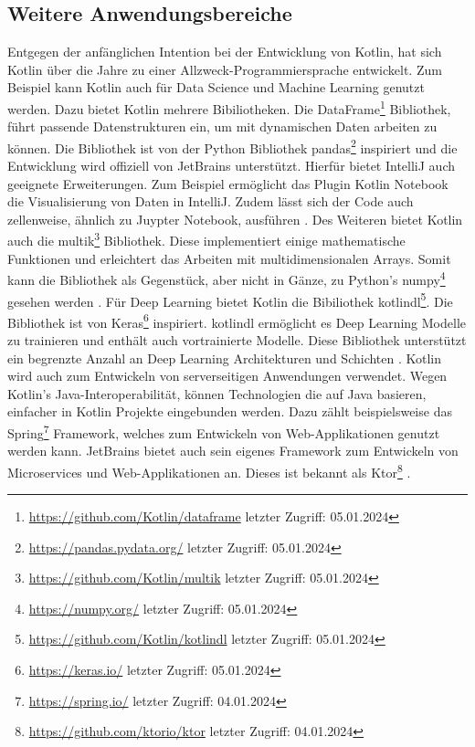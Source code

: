 \documentclass{article}
\begin{document}
\subsection{Weitere Anwendungsbereiche}
Entgegen der anfänglichen Intention bei der Entwicklung von Kotlin, hat sich Kotlin über die Jahre zu einer Allzweck-Programmiersprache entwickelt. Zum Beispiel kann Kotlin auch für Data Science und Machine Learning genutzt werden. Dazu bietet Kotlin mehrere Bibiliotheken. Die DataFrame\footnote{\url{https://github.com/Kotlin/dataframe} letzter Zugriff: 05.01.2024} Bibliothek, führt passende Datenstrukturen ein, um mit dynamischen Daten arbeiten zu können. Die Bibliothek ist von der Python Bibliothek pandas\footnote{\url{https://pandas.pydata.org/} letzter Zugriff: 05.01.2024} inspiriert und die Entwicklung wird offiziell von JetBrains unterstützt. Hierfür bietet IntelliJ auch geeignete Erweiterungen. Zum Beispiel ermöglicht das Plugin Kotlin Notebook die Visualisierung von Daten in IntelliJ. Zudem lässt sich der Code auch zellenweise, ähnlich zu Juypter Notebook, ausführen \cite{KotlinLangDocData}. \newline
Des Weiteren bietet Kotlin auch die multik\footnote{\url{https://github.com/Kotlin/multik} letzter Zugriff: 05.01.2024} Bibliothek. Diese implementiert einige mathematische Funktionen und erleichtert das Arbeiten mit multidimensionalen Arrays. Somit kann die Bibliothek als Gegenstück, aber nicht in Gänze, zu Python's numpy\footnote{\url{https://numpy.org/} letzter Zugriff: 05.01.2024} gesehen werden \cite{KotlinLangDocData}. \newline
Für Deep Learning bietet Kotlin die Bibiliothek kotlindl\footnote{\url{https://github.com/Kotlin/kotlindl} letzter Zugriff: 05.01.2024}. Die Bibliothek ist von Keras\footnote{\url{https://keras.io/} letzter Zugriff: 05.01.2024} inspiriert. kotlindl ermöglicht es Deep Learning Modelle zu trainieren und enthält auch vortrainierte Modelle. Diese Bibliothek unterstützt ein begrenzte Anzahl an Deep Learning Architekturen und Schichten \cite{KotlinLangDocData}. \newline
Kotlin wird auch zum Entwickeln von serverseitigen Anwendungen verwendet. Wegen Kotlin's Java-Interoperabilität, können Technologien die auf Java basieren, einfacher in Kotlin Projekte eingebunden werden. Dazu zählt beispielsweise das Spring\footnote{\url{https://spring.io/} letzter Zugriff: 04.01.2024} Framework, welches zum Entwickeln von Web-Applikationen genutzt werden kann. JetBrains bietet auch sein eigenes Framework zum Entwickeln von Microservices und Web-Applikationen an. Dieses ist bekannt als Ktor\footnote{\url{https://github.com/ktorio/ktor} letzter Zugriff: 04.01.2024} \cite{KotlinLangDocServer}.
\end{document}
